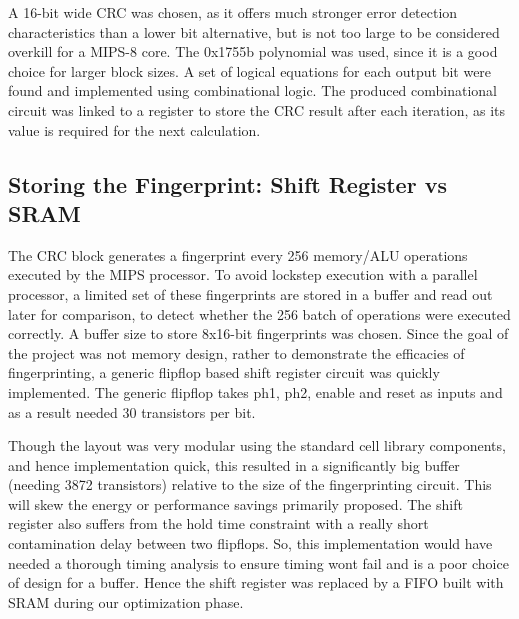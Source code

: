 \documentclass[10pt,journal,compsoc]{IEEEtran}
\begin{document}
A 16-bit wide CRC was chosen, as it offers much stronger error detection characteristics than a lower bit alternative, but is not too large to be considered overkill for a MIPS-8 core. The 0x1755b polynomial was used, since it is a good choice for larger block sizes\cite{Koopman}. A set of logical equations for each output bit were found\cite{Parcrc} and implemented using combinational logic. The produced combinational circuit was linked to a register to store the CRC result after each iteration, as its value is required for the next calculation. 


\subsection{Storing the Fingerprint: Shift Register vs SRAM}
The CRC block generates a fingerprint every 256 memory/ALU operations executed by the MIPS processor. To avoid lockstep execution with a parallel processor, a limited set of these fingerprints are stored in a buffer and read out later for comparison, to detect whether the 256 batch of operations were executed correctly. A buffer size to store 8x16-bit fingerprints was chosen. Since the goal of the project was not memory design, rather to demonstrate the efficacies of fingerprinting, a generic flipflop based shift register circuit was quickly implemented. The generic flipflop takes ph1, ph2, enable and reset as inputs and as a result needed 30 transistors per bit. 

Though the layout was very modular using the standard cell library components, and hence implementation quick, this resulted in a significantly big buffer (needing 3872 transistors) relative to the size of the fingerprinting circuit. This will skew the energy or performance savings primarily proposed. The shift register also suffers from the hold time constraint with a really short contamination delay between two flipflops. So, this implementation would have needed a thorough timing analysis to ensure timing wont fail and is a poor choice of design for a buffer. Hence the shift register was replaced by a FIFO built with SRAM during our optimization phase.
\end{document}
